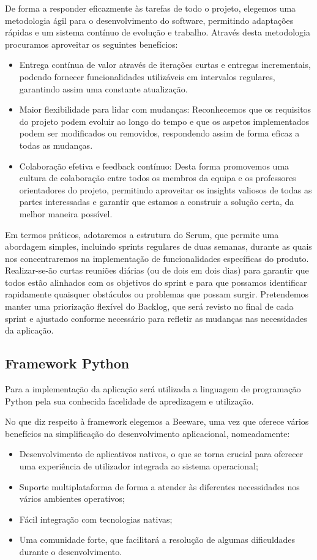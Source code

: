 \documentclass[conference]{IEEEtran}
\begin{document}
	De forma a responder eficazmente às tarefas de todo o projeto, elegemos uma metodologia ágil para o desenvolvimento do software, permitindo adaptações rápidas e um sistema
	contínuo de evolução e trabalho. Através desta metodologia procuramos aproveitar os
	seguintes benefícios:
	\begin{itemize}	
	\item Entrega contínua de valor através de iterações curtas e entregas incrementais, podendo fornecer funcionalidades utilizáveis em intervalos regulares, garantindo assim uma constante atualização.
	\item Maior flexibilidade para lidar com mudanças: Reconhecemos que os requisitos do projeto podem evoluir ao longo do tempo e que os aspetos implementados podem ser modificados ou removidos, respondendo assim de forma eficaz a todas as mudanças.
	\item Colaboração efetiva e feedback contínuo: Desta forma promovemos uma cultura de colaboração entre todos os membros da equipa e os professores orientadores do projeto, permitindo aproveitar os insights valiosos de todas as partes interessadas e garantir que estamos a construir a solução certa, da melhor maneira possível.
	\end{itemize}
	Em termos práticos, adotaremos a estrutura do Scrum, que permite uma abordagem simples, incluindo sprints regulares de duas semanas, durante as quais nos concentraremos na implementação de funcionalidades específicas do produto. Realizar-se-ão curtas reuniões diárias (ou de dois em dois dias) para garantir que todos estão alinhados com os objetivos do sprint e para que possamos identificar rapidamente quaisquer obstáculos ou problemas que possam surgir. Pretendemos manter uma priorização flexível do Backlog, que será revisto no final de cada sprint e ajustado conforme necessário para refletir as mudanças nas necessidades da
	aplicação.
	
	\subsection{Framework Python}\label{AA}
	Para a implementação da aplicação será utilizada a linguagem de programação Python pela sua conhecida facelidade de apredizagem e utilização. 
	
	No que diz respeito à framework elegemos a Beeware, uma vez que oferece vários benefícios na simplificação do desenvolvimento aplicacional, nomeadamente:
	\begin{itemize}
	\item Desenvolvimento de aplicativos nativos, o que se torna crucial para oferecer uma experiência de utilizador integrada ao sistema operacional;
	
	\item Suporte multiplataforma de forma a atender às diferentes necessidades nos vários ambientes operativos;
	
	\item Fácil integração com tecnologias nativas;
	
	\item Uma comunidade forte, que facilitará a resolução de algumas dificuldades durante o desenvolvimento.	
	\end{itemize}
	
\end{document}
